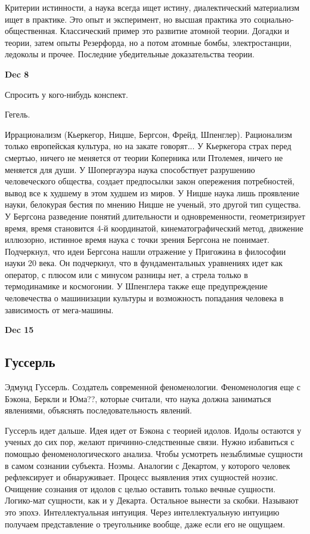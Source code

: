\documentclass[a4paper, 12pt]{article}
\begin{document}
Критерии истинности, а наука всегда ищет истину, диалектический 
материализм ищет в практике. Это опыт и эксперимент, но высшая практика 
это социально-общественная. Классический пример это развитие атомной 
теории. Догадки и теории, затем опыты Резерфорда, но а потом атомные 
бомбы, электростанции, ледоколы и прочее. Последние убедительные 
доказательства теории.

\hfill \textbf{Dec 8}

Спросить у кого-нибудь конспект.

Гегель.

Иррационализм (Кьеркегор, Ницше, Бергсон, Фрейд, Шпенглер).
Рационализм только европейская культура, но на закате говорят...
У Кьеркегора страх перед смертью, ничего не меняется от теории Коперника 
или Птолемея, ничего не меняется для души.
У Шопергауэра наука способствует разрушению человеческого общества, 
создает предпосылки закон опережения потребностей, вывод все к худшему 
в этом худшем из миров.
У Ницше наука лишь проявление науки, белокурая бестия по мнению Ницше не 
ученый, это другой тип существа.
У Бергсона разведение понятий длительности и одновременности, 
геометризирует время, время становится 4-й координатой, 
кинематографический метод, движение иллюзорно, истинное время наука 
с точки зрения Бергсона не понимает. Подчеркнул, что идеи Бергсона нашли 
отражение у Пригожина в философии науки 20 века. Он подчеркнул, что 
в фундаментальных уравнениях идет как оператор, с плюсом или с минусом 
разницы нет, а стрела только в термодинамике и космогонии.
У Шпенглера также еще предупреждение человечества о машинизации культуры 
и возможность попадания человека в зависимость от мега-машины.

\hfill \textbf{Dec 15}


\subsection{Гуссерль}
Эдмунд Гуссерль. Создатель современной феноменологии. Феноменология еще 
с Бэкона, Беркли и Юма??, которые считали, что наука должна заниматься 
явлениями, объяснять последовательность явлений.

Гуссерль идет дальше. Идея идет от Бэкона с теорией идолов. Идолы 
остаются у ученых до сих пор, желают причинно-следственные связи. Нужно 
избавиться с помощью феноменологического анализа. Чтобы усмотреть 
незыблимые сущности в самом сознании субъекта. Ноэмы. Аналогии 
с Декартом, у которого человек рефлексирует и обнаруживает. Процесс 
выявления этих сущностей ноэзис. Очищение сознания от идолов с целью 
оставить только вечные сущности. Логико-мат сущности, как и у Декарта. 
Остальное вынести за скобки. Называют это эпохэ. Интеллектуальная 
интуиция. Через интеллектуальную интуицию получаем представление 
о треугольнике вообще, даже если его не ощущаем.
\end{document}
